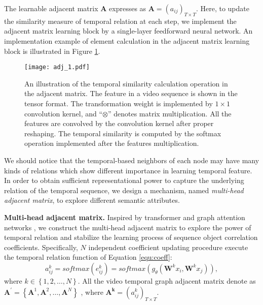 \documentclass[conference,compsoc]{IEEEtran}
\begin{document}
    The learnable adjacent matrix $\mathbf{A}$ expresses as $\mathbf{A}=(a_{ij})_{T \times T}$. Here, to update the similarity measure of temporal relation at each step, we implement the adjacent matrix learning block by a single-layer feedforward neural network. An implementation example of element calculation in the adjacent matrix learning block is illustrated in Figure \ref{fig:module1}.
    
\begin{figure}[h]
    \centering
    \texttt{[image: adj\_1.pdf]}
\caption{An illustration of the temporal similarity calculation operation in the adjacent matrix. The feature in a video sequence is shown in the tensor format. The transformation weight is implemented by $1\times1$ convolution kernel, and ``$\otimes$'' denotes matrix multiplication. All the features are convolved by the convolution kernel after proper reshaping. The temporal similarity is computed by the softmax operation implemented after the features multiplication.}
    \label{fig:module1}
\end{figure}
    

    We should notice that the temporal-based neighbors of each node may have many kinds of relations which show different importance in learning temporal feature. In order to obtain sufficient representational power to capture the underlying relation of the temporal sequence, we design a mechanism, named \textit{multi-head adjacent matrix}, to explore different semantic attributes.
    
    \textbf{Multi-head adjacent matrix.} Inspired by transformer \cite{vaswani2017attention} and graph attention networks \cite{velickovic2018graph}, we construct the multi-head adjacent matrix to explore the power of temporal relation and stabilize the learning process of sequence object correlation coefficients. Specifically, $N$ independent coefficient updating procedure execute the temporal relation function of Equation \ref{equ:coeff}:
    \begin{equation}
        a_{ij}^{k} = softmax\left(e_{ij}^{k}\right) = softmax\left( g_{\theta}\left( \mathbf{W}^{k}x_{i}, \mathbf{W}^{k}x_{j} \right) \right),
        \label{equ:node_weight}
    \end{equation}
    where $k \in \left\{ 1, 2, \ldots, N \right\}$. All the video temporal graph adjacent matrix denote as $\mathbf{A^{\prime}}=\left\{ \mathbf{A}^{1}, \mathbf{A}^{2}, \dots, \mathbf{A}^{N} \right\}$ , where $\mathbf{A^{k}}=(a_{ij}^{k})_{T \times T}$.
    
\end{document}
